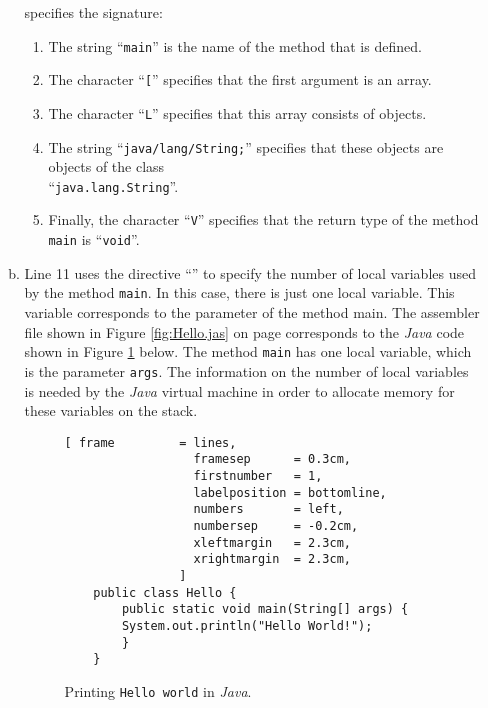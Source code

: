 \begin{enumerate}
\begin{enumerate}[(a)]
        specifies the signature:
        \begin{enumerate}
        \item The string ``\texttt{main}''  is the name of the method that is defined.
        \item The character ``\texttt{[}'' specifies that the first argument is an array.
        \item The character ``\texttt{L}'' specifies that this array consists of objects.
        \item The string ``\texttt{java/lang/String;}'' specifies that these objects are objects of
              the class \\
              ``\texttt{java.lang.String}''.
        \item Finally, the character ``\texttt{V}'' specifies that the return type of the method \texttt{main}
              is ``\texttt{void}''.
       \end{enumerate}
  \item Line 11 uses the directive ``\texttt{}'' to specify the number of local variables 
        used by the method \texttt{main}.  In this case, there is just one local variable.  This variable
        corresponds to the parameter of the method main.  The assembler file shown in Figure
        \ref{fig:Hello.jas} on page \pageref{fig:Hello.jas} corresponds to the \textsl{Java} code
        shown in Figure \ref{fig:Hello.java} below.  The method \texttt{main} has one local
        variable, which is the parameter \texttt{args}.
        The information on the number of local variables is needed by the \textsl{Java} virtual
        machine in order to allocate memory for these variables on the stack.

\begin{figure}[!ht]
\centering
\begin{Verbatim}[ frame         = lines, 
                  framesep      = 0.3cm, 
                  firstnumber   = 1,
                  labelposition = bottomline,
                  numbers       = left,
                  numbersep     = -0.2cm,
                  xleftmargin   = 2.3cm,
                  xrightmargin  = 2.3cm,
                ]
    public class Hello {
        public static void main(String[] args) {
    	System.out.println("Hello World!");
        }
    }
\end{Verbatim}
\vspace*{-0.3cm}
\caption{Printing \texttt{Hello world} in \textsl{Java}.} 
\label{fig:Hello.java}
\end{figure}


\end{enumerate}
\end{enumerate}
